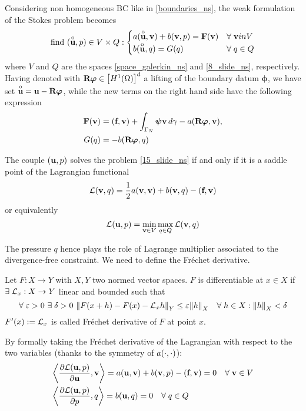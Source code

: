 Considering non homogeneous BC like in \eqref{boundaries_ns}, the weak formulation of the Stokes problem becomes
\begin{equation}
    \text{find } (\overset{\mathrm{o}}{\textbf{u}}, p) \in V \times Q: 
    \begin{cases}
        a(\overset{\mathrm{o}}{\textbf{u}}, \textbf{v}) + b(\textbf{v}, p) = \textbf{F}(\textbf{v}) & \forall \; \textbf{v} in V \\
        b(\overset{\mathrm{o}}{\textbf{u}}, q) = G(q) &\forall \; q \in Q
    \end{cases}
    \label{16_slide_ns}
\end{equation}
where \(V\) and \(Q\) are the spaces \eqref{space_galerkin_ns} and \eqref{8_slide_ns}, respectively. Having denoted with \(\textbf{R}\bm{\varphi} \in \left[ H^1(\Omega) \right]^d\) a lifting of the boundary datum \(\bm{\phi}\), we have set \(\overset{\mathrm{o}}{\textbf{u}} = \textbf{u} -\textbf{R}\bm{\varphi}\), while the new terms on the right hand side have the following expression
\begin{equation}
    \begin{aligned}
        \textbf{F}(\textbf{v}) &= (\textbf{f}, \textbf{v}) + \int_{\Gamma_N} \bm{\psi}\textbf{v} \, d\gamma - a(\textbf{R}\bm{\varphi}, \textbf{v}), \\
        G(q) &= -b(\textbf{R}\bm{\varphi}, q)
    \end{aligned}
    \label{17_slide_ns}
\end{equation}
\begin{theorem}
    The couple \((\textbf{u}, p)\) solves the problem \eqref{15_slide_ns} if and only if it is a saddle point of the Lagrangian functional 
    \[
        \mathcal{L}(\textbf{v}, q) = \frac{1}{2} a(\textbf{v},\textbf{v}) + b(\textbf{v},q) - (\textbf{f}, \textbf{v})    
    \]
    or equivalently 
    \[
        \mathcal{L}(\textbf{u}, p) = \min_{\textbf{v} \in V} \max_{q \in Q} \mathcal{L} (\textbf{v}, q)    
    \]
\end{theorem}
The pressure \(q\) hence plays the role of Lagrange multiplier associated to the divergence-free constraint. 
We need to define the Fréchet derivative. 
\begin{definition}
    Let \(F:X\to Y\) with \(X,Y\) two normed vector spaces. \(F\) is differentiable at \(x \in X\) if \(\exists \; \mathcal{L}_x: X\to Y\) linear and bounded such that 
    \[
        \forall \; \varepsilon > 0 \ \exists \; \delta > 0 \ \norm{F(x+h) - F(x) - \mathcal{L}_x h}_Y \leq \varepsilon\norm{h}_X \quad \forall \; h \in X : \norm{h}_X < \delta
    \]
    \(F'(x) := \mathcal{L}_x\) is called Fréchet derivative of \(F\) at point \(x\).
\end{definition}
By formally taking the Fréchet derivative of the Lagrangian with respect to the two variables (thanks to the symmetry of \(a(\cdot, \cdot)\)): 
\begin{align*}
    &\bigg\langle\partialderivative{\loperator(\uvec, p)}{\uvec}, \vvec \bigg\rangle = a(\uvec, \vvec) +b(\vvec,p) -(\vect{f},\vvec) = 0 \quad \forall \; \vvec \in V \\
    &\bigg\langle \partialderivative{\loperator(\uvec,p)}{p}, q\bigg\rangle = b(\uvec, q) = 0 \quad \forall \; q \in Q 
\end{align*}
